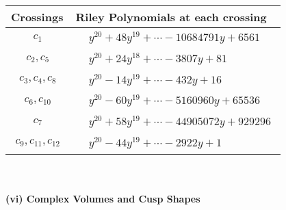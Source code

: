 \documentclass[1p]{elsarticle_modified}
\theoremstyle{definition}
\begin{document}
\begin{tabular}{m{50pt}|m{274pt}}
Crossings & \hspace{64pt}Riley Polynomials at each crossing \\
\hline $$\begin{aligned}c_{1}\end{aligned}$$&$\begin{aligned}
&y^{20}+48 y^{19}+\cdots-10684791 y+6561
\end{aligned}$\\
\hline $$\begin{aligned}c_{2},c_{5}\end{aligned}$$&$\begin{aligned}
&y^{20}+24 y^{18}+\cdots-3807 y+81
\end{aligned}$\\
\hline $$\begin{aligned}c_{3},c_{4},c_{8}\end{aligned}$$&$\begin{aligned}
&y^{20}-14 y^{19}+\cdots-432 y+16
\end{aligned}$\\
\hline $$\begin{aligned}c_{6},c_{10}\end{aligned}$$&$\begin{aligned}
&y^{20}-60 y^{19}+\cdots-5160960 y+65536
\end{aligned}$\\
\hline $$\begin{aligned}c_{7}\end{aligned}$$&$\begin{aligned}
&y^{20}+58 y^{19}+\cdots-44905072 y+929296
\end{aligned}$\\
\hline $$\begin{aligned}c_{9},c_{11},c_{12}\end{aligned}$$&$\begin{aligned}
&y^{20}-44 y^{19}+\cdots-2922 y+1
\end{aligned}$\\
\hline
\end{tabular}\\~\\
\newpage\flushleft \textbf{(vi) Complex Volumes and Cusp Shapes}
\end{document}
